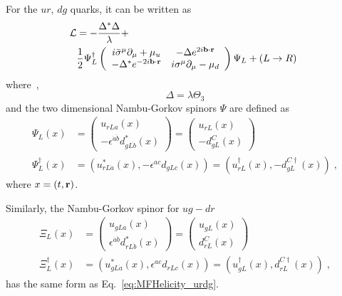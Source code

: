 \documentclass[10pt, aps, prd, superscriptaddress, nofootinbib, 
               amsmath, amssymb, twocolumn,
               preprintnumbers, showpacs,
               raggedbottom,
               floatfix]{revtex4-1}
\newcommand{\dota}{{\dot{a}}}
\newcommand{\dotb}{{\dot{b}}}
\newcommand{\calL}{{\cal{L}}}
\newcommand{\bfr}{{\bf{r}}}
\newcommand{\bfb}{{\bf{b}}}
\begin{document}
For the $ur$, $dg$ quarks, it can be written as
\begin{equation}
\begin{split}
{\calL} 
&= 
-\frac{\Delta^*\Delta}{\lambda}+\\
&\frac{1}{2}\Psi^\dagger_L\left(\begin{array}{cc}
   i\bar{\sigma}^{\mu}\partial_\mu + \mu_u 
   &-\Delta e^{2i\bfb\cdot\bfr}\\
  -\Delta^{*}e^{-2i\bfb\cdot\bfr}&i\sigma^{\mu}\partial_\mu - \mu_d 
  \end{array}
  \right)\Psi_L+(L\rightarrow R)~\label{eq:MFHelicity_urdg}
\end{split}
\end{equation}
where~\cite{Rajagopal:2000wf},
\begin{equation}
\Delta=\lambda\Theta_3
\end{equation}
and the two dimensional Nambu-Gorkov spinors $\Psi$ are defined as
\begin{equation}
\begin{split}
\Psi_L(x) & = \left(
\begin{array}{c}u_{rLa}(x) \\ -\epsilon^{\dota\dotb}d^*_{gL\dotb}(x)\end{array}
\right)
= \left(\begin{array}{c}u_{rL}(x)\\ -d_{gL}^{C}(x)\end{array}\right)
\\
\Psi_L^\dagger(x) &= (u_{rL\dota}^*(x), -\epsilon^{ac}d_{gLc}(x))
= (u_{rL}^\dagger(x), -d_{gL}^{C\dagger}(x))\;,
\end{split}
\end{equation}
where $x=(t,\bfr)$.

Similarly, the Nambu-Gorkov spinor for $ug-dr$ 
\begin{equation}
\begin{split}
\Xi_L(x) & = \left(
\begin{array}{c}u_{gLa}(x) \\ \epsilon^{\dota\dotb}d^*_{rL\dotb}(x)\end{array}
\right)
= \left(\begin{array}{c}u_{gL}(x)\\ d_{rL}^{C}(x)\end{array}\right)
\\
\Xi_L^\dagger(x) &= (u_{gL\dota}^*(x), \epsilon^{ac}d_{rLc}(x))
= (u_{gL}^\dagger(x), d_{rL}^{C\dagger}(x))\;,
\end{split}
\end{equation}
has the same form as Eq.~\ref{eq:MFHelicity_urdg}. 
\end{document}
